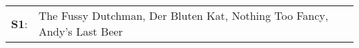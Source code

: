 \begin{supertabular}{p{0.03\textwidth}p{0.92\textwidth}}
 \textbf{S1}:  &  The Fussy Dutchman\textsuperscript{}, \enspace Der Bluten Kat\textsuperscript{}, \enspace Nothing Too Fancy\textsuperscript{}, \enspace Andy's Last Beer\textsuperscript{}  \enspace  \\
\end{supertabular}
